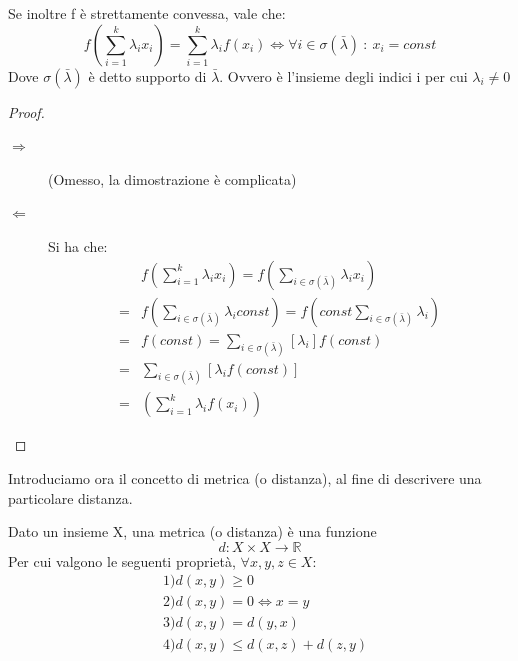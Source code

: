 \begin{corollario}
 Se inoltre f è strettamente convessa, vale che:
 \[
 f \left( \sum_{i=1}^k \lambda_i x_i \right) = \sum_{i=1}^k \lambda_i f(x_i) \iff \forall i \in \sigma(\bar{\lambda}) \ : \ x_i=const
 \]
 Dove $\sigma(\bar{\lambda})$ è detto supporto di $\bar{\lambda}$. Ovvero è l'insieme degli indici i per cui $\lambda_i \ne 0$
 \begin{proof}
 \mbox{}

  \begin{description}
   \item[\(\Longrightarrow\)] (Omesso, la dimostrazione è complicata)
   \item[\(\Longleftarrow\)] 
   Si ha che:
   \[\begin{split}
    & f \left( \sum_{i=1}^k \lambda_i x_i \right)=
    f \left( \sum_{i \in \sigma(\bar{\lambda}) } \lambda_i x_i \right) \\
    =& f \left( \sum_{i \in \sigma(\bar{\lambda}) } \lambda_i const \right)=
     f \left( const \sum_{i \in \sigma(\bar{\lambda}) } \lambda_i \right) \\
    =& f \left( const \right)= \sum_{i \in \sigma(\bar{\lambda}) } [\lambda_i] f \left( const \right) \\
    =& \sum_{i \in \sigma(\bar{\lambda}) } [\lambda_i f \left( const \right)] \\
    =& \left( \sum_{i=1}^k \lambda_i f(x_i) \right)
     \end{split}
   \]

  \end{description}
 \end{proof}
\end{corollario}

\bigskip

\noindent
Introduciamo ora il concetto di metrica (o distanza), al fine di descrivere una particolare distanza.

\begin{definizione}[Metrica]
 Dato un insieme X, una metrica (o distanza) è una funzione
\[
 d: X \times X \to \mathbb{R}
\]
Per cui valgono le seguenti proprietà, $\forall x,y,z \in X$:
\[\begin{split}
 & 1) d(x,y) \ge 0 \\
 & 2) d(x,y)=0 \iff x=y \\
 & 3) d(x,y)=d(y,x) \\
 & 4) d(x,y) \le d(x,z)+d(z,y)
 \end{split}
\]
\end{definizione}

